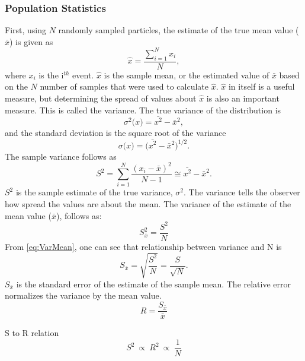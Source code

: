 \subsubsection{Population Statistics}
\label{subsubsec:PopStat}

First, using $N$ randomly sampled particles, the estimate of the true mean value
($\bar{x}$) is given as
\begin{equation}
  \hat{x} = \frac{\sum_{i=1}^{N}{x_i}}{N} ,
\end{equation}
where $x_i$ is the i$^{th}$ event. $\hat{x}$ is the sample mean, or the
estimated value of $\bar{x}$
based on the $N$ number of samples that were used to calculate $\hat{x}$.
$\hat{x}$ in itself is a useful measure, but determining the spread of values
about $\hat{x}$ is also an important measure. This is called the variance. The
true variance of the distribution is
\begin{equation}
  \sigma^{2}\big( x \big) = \bar{x^2} - \bar{x}^2 ,
\end{equation}
and the standard deviation is the square root of the variance
\begin{equation}
  \sigma\big(x \big) = \big( \bar{x^2} - \bar{x}^2 \big)^{1/2}.
\end{equation}
The sample variance follows as
\begin{equation}
S^{ 2 }=\sum _{ i=1 }^{ N }{ \frac { (x_{ i }-\bar { x } )^{ 2 } }{ N-1 }  }
             \cong \bar{x^2}-\bar{x}^2 .
\label{eq:Var}
\end{equation}
$S^2$ is the sample estimate of the true variance, $\sigma^2$. The variance
tells the observer how spread the values are about the mean.
The variance of the estimate of the mean value ($\bar{x}$), follows as:
\begin{equation}
S^{ 2 }_{ \bar { x }  }=\frac{S^2}{N}
\label{eq:VarMean}
\end{equation}
From \ref{eq:VarMean}, one can see that relationship between variance and N is
\begin{equation}
S_{ \bar { x }  }=\sqrt { \frac { S^{ 2 } }{ N }  } =\frac { S }{ \sqrt { N }}.
\label{eq:VarN}
\end{equation}
$S_{\bar{x}}$ is the standard error of the estimate of the sample mean.
The relative error normalizes the variance by the mean value.
\begin{equation}
R = \frac{S_{ \bar { x }  }}{\bar{x}}
\label{eq:RelativeErr}
\end{equation}

S to R relation
\begin{equation}
S^2\:\propto\: R^2\:\propto\:\frac{1}{N}
\label{eq:S to R}
\end{equation}

